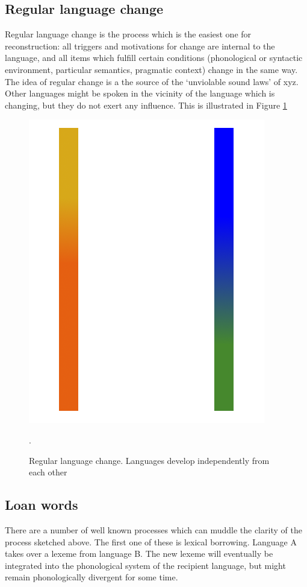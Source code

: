 \documentclass[a4paper,10pt]{article}
\begin{document}
\subsection{Regular language change}
Regular language change is the process which is the easiest one for reconstruction: all triggers and motivations for change are internal to the language, and all items which fulfill certain conditions (phonological or syntactic environment, particular semantics, pragmatic context) change in the same way. The idea of regular change is a the source of the `unviolable sound laws' of xyz. Other languages might be spoken in the vicinity of the language which is changing, but they do not exert any influence. This is illustrated in Figure \ref{fig:regularchange}


\begin{figure} 
\centering
    \includegraphics[height=.3\textheight]{standard.png}
\caption{Regular language change. Languages develop independently from each other}.
\label{fig:regularchange}
\end{figure}


\subsection{Loan words}
There are a number of well known processes which can muddle the clarity of the process sketched above. The first one of these is lexical borrowing. Language A takes over a lexeme from language B. The new lexeme will eventually be integrated into the phonological system of the recipient language, but might remain phonologically divergent for some time. 
\end{document}
